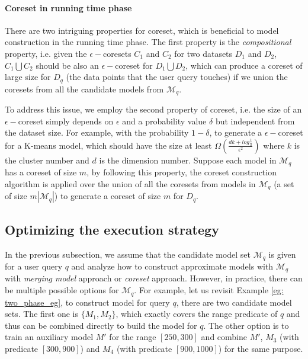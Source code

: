 \paragraph{Coreset in running time phase} There are two intriguing properties for coreset, which is beneficial to model construction in the running time phase. The first property is the {\em compositional} property, i.e. given the $\epsilon-$coresets $C_1$ and $C_2$ for two datasets $D_1$ and $D_2$, $C_1 \bigcup C_2$ should be also an $\epsilon-$coreset for $D_1 \bigcup D_2$, which can produce a coreset of large size for $D_q$ (the data points that the user query touches) if we union the coresets from all the candidate models from $\mathcal{M}_q$. 

To address this issue, we employ the second property of coreset, i.e. the size of an $\epsilon-$coreset simply depends on $\epsilon$ and a probability value $\delta$ but independent from the dataset size. For example, with the probability $1-\delta$, to generate a $\epsilon-$coreset for a K-means model, which should have the size at least $\Omega(\frac{dk+log\frac{1}{\delta}}{\epsilon^2})$ where $k$ is the cluster number and $d$ is the dimension number. Suppose each model in $\mathcal{M}_q$ has a coreset of size $m$, by following this property, the coreset construction algorithm is applied over the union of all the coresets from models in $\mathcal{M}_q$ (a set of size $m|\mathcal{M}_q|$) to generate a coreset of size $m$ for $D_q$.


\subsection{Optimizing the execution strategy}\label{sec: opt}
In the previous subsection, we assume that the candidate model set $\mathcal{M}_q$ is given for a user query $q$ and analyze how to construct approximate models with $\mathcal{M}_q$ with {\em merging model} approach or {\em coreset} approach. However, in practice, there can be multiple possible options for $\mathcal{M}_q$. For example, let us revisit Example \ref{eg: two_phase_eg}, to construct model for query $q$, there are two candidate model sets. The first one is $\{M_1, M_2\}$, which exactly covers the range predicate of $q$ and thus can be combined directly to build the model for $q$. The other option is to train an auxiliary model $M'$ for the range $[250, 300]$ and combine $M'$, $M_3$ (with predicate $[300, 900]$) and $M_4$ (with predicate $[900, 1000]$) for the same purpose. 

